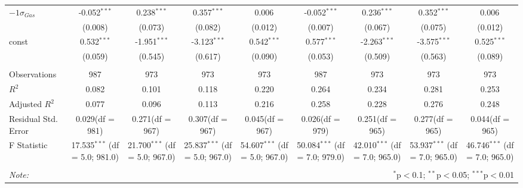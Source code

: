 \begin{table}[!htbp]
\begin{tabular}{@{\extracolsep{5pt}}lcccccccc}
 ${	-1 \sigma}_{Gas}$ & -0.052$^{***}$ & 0.238$^{***}$ & 0.357$^{***}$ & 0.006$^{}$ & -0.052$^{***}$ & 0.236$^{***}$ & 0.352$^{***}$ & 0.006$^{}$ \\
  & (0.008) & (0.073) & (0.082) & (0.012) & (0.007) & (0.067) & (0.075) & (0.012) \\
 const & 0.532$^{***}$ & -1.951$^{***}$ & -3.123$^{***}$ & 0.542$^{***}$ & 0.577$^{***}$ & -2.263$^{***}$ & -3.575$^{***}$ & 0.525$^{***}$ \\
  & (0.059) & (0.545) & (0.617) & (0.090) & (0.053) & (0.509) & (0.563) & (0.089) \\
\hline \\[-1.8ex]
 Observations & 987 & 973 & 973 & 973 & 987 & 973 & 973 & 973 \\
 $R^2$ & 0.082 & 0.101 & 0.118 & 0.220 & 0.264 & 0.234 & 0.281 & 0.253 \\
 Adjusted $R^2$ & 0.077 & 0.096 & 0.113 & 0.216 & 0.258 & 0.228 & 0.276 & 0.248 \\
 Residual Std. Error & 0.029(df = 981) & 0.271(df = 967) & 0.307(df = 967) & 0.045(df = 967) & 0.026(df = 979) & 0.251(df = 965) & 0.277(df = 965) & 0.044(df = 965)  \\
 F Statistic & 17.535$^{***}$ (df = 5.0; 981.0) & 21.700$^{***}$ (df = 5.0; 967.0) & 25.837$^{***}$ (df = 5.0; 967.0) & 54.607$^{***}$ (df = 5.0; 967.0) & 50.084$^{***}$ (df = 7.0; 979.0) & 42.010$^{***}$ (df = 7.0; 965.0) & 53.937$^{***}$ (df = 7.0; 965.0) & 46.746$^{***}$ (df = 7.0; 965.0) \\
\hline
\hline \\[-1.8ex]
\textit{Note:} & \multicolumn{8}{r}{$^{*}$p$<$0.1; $^{**}$p$<$0.05; $^{***}$p$<$0.01} \\
\end{tabular}
\end{table}